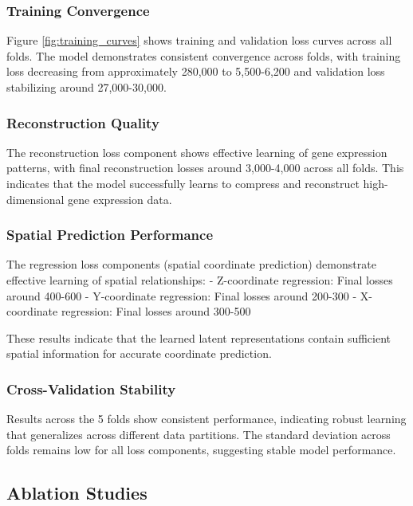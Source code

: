 \documentclass[11pt]{article}
\begin{document}
\subsubsection{Training Convergence}

Figure \ref{fig:training_curves} shows training and validation loss curves across all folds. The model demonstrates consistent convergence across folds, with training loss decreasing from approximately 280,000 to 5,500-6,200 and validation loss stabilizing around 27,000-30,000.

\subsubsection{Reconstruction Quality}

The reconstruction loss component shows effective learning of gene expression patterns, with final reconstruction losses around 3,000-4,000 across all folds. This indicates that the model successfully learns to compress and reconstruct high-dimensional gene expression data.

\subsubsection{Spatial Prediction Performance}

The regression loss components (spatial coordinate prediction) demonstrate effective learning of spatial relationships:
- Z-coordinate regression: Final losses around 400-600
- Y-coordinate regression: Final losses around 200-300  
- X-coordinate regression: Final losses around 300-500

These results indicate that the learned latent representations contain sufficient spatial information for accurate coordinate prediction.

\subsubsection{Cross-Validation Stability}

Results across the 5 folds show consistent performance, indicating robust learning that generalizes across different data partitions. The standard deviation across folds remains low for all loss components, suggesting stable model performance.

\subsection{Ablation Studies}
\end{document}
